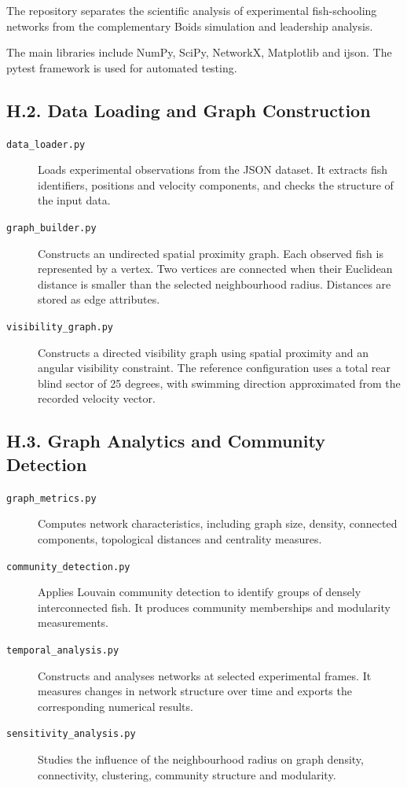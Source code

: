\documentclass[10pt,a4paper]{article}
\begin{document}
The repository separates the scientific analysis of
experimental fish-schooling networks from the complementary
Boids simulation and leadership analysis.

The main libraries include NumPy, SciPy, NetworkX,
Matplotlib and ijson. The pytest framework is used
for automated testing.

\subsection*{H.2. Data Loading and Graph Construction}

\begin{description}

\item[\texttt{data\_loader.py}]
Loads experimental observations from the JSON dataset.
It extracts fish identifiers, positions and velocity
components, and checks the structure of the input data.

\item[\texttt{graph\_builder.py}]
Constructs an undirected spatial proximity graph.
Each observed fish is represented by a vertex.
Two vertices are connected when their Euclidean
distance is smaller than the selected neighbourhood
radius. Distances are stored as edge attributes.

\item[\texttt{visibility\_graph.py}]
Constructs a directed visibility graph using spatial
proximity and an angular visibility constraint.
The reference configuration uses a total rear blind
sector of 25 degrees, with swimming direction
approximated from the recorded velocity vector.

\end{description}

\subsection*{H.3. Graph Analytics and Community Detection}

\begin{description}

\item[\texttt{graph\_metrics.py}]
Computes network characteristics, including graph
size, density, connected components, topological
distances and centrality measures.

\item[\texttt{community\_detection.py}]
Applies Louvain community detection to identify
groups of densely interconnected fish.
It produces community memberships and modularity
measurements.

\item[\texttt{temporal\_analysis.py}]
Constructs and analyses networks at selected
experimental frames. It measures changes in
network structure over time and exports the
corresponding numerical results.

\item[\texttt{sensitivity\_analysis.py}]
Studies the influence of the neighbourhood radius
on graph density, connectivity, clustering,
community structure and modularity.

\end{description}
\end{document}
